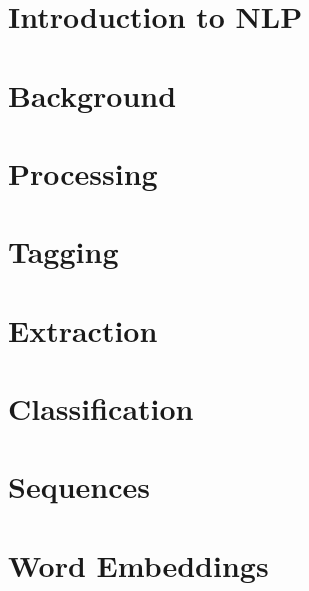 \section[Intro]{Introduction to NLP}


% 

\section[Back]{Background}

\section[Proc]{Processing}

  
 


\section[Tag]{Tagging}







\section[Extr]{Extraction}
 



\section[Class]{Classification}


\section[Seq]{Sequences}



\section[Embedding]{Word Embeddings}
% 


